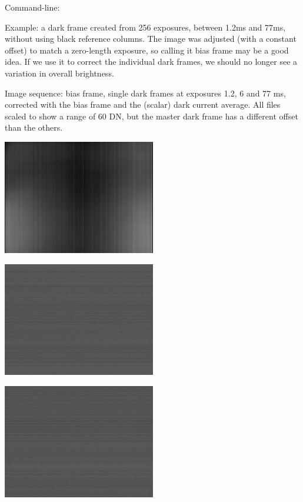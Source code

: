 Command-line:


Example: a dark frame created from 256 exposures, between 1.2ms and 77ms, without using black reference columns. The image was adjusted (with a constant offset) to match a zero-length exposure, so calling it bias frame may be a good idea. If we use it to correct the individual dark frames, we should no longer see a variation in overall brightness. 

    
Image sequence: bias frame, single dark frames at exposures 1.2, 6 and 77 ms, corrected with the bias frame and the (scalar) dark current average. All files scaled to show a range of 60 DN, but the master dark frame has a different offset than the others.     


\begin{center}
\includegraphics[height=5cm]{images/darkframe-x1-no-blackcol-256}
\end{center}

\begin{center}
\includegraphics[height=5cm]{images/blackframes-gainx1-offset2047-1ms-01-simple-darkframe-no-blackcol}
\end{center} 

\begin{center}
\includegraphics[height=5cm]{images/blackframes-gainx1-offset2047-5ms-01-simple-darkframe-no-blackcol}
\end{center}

